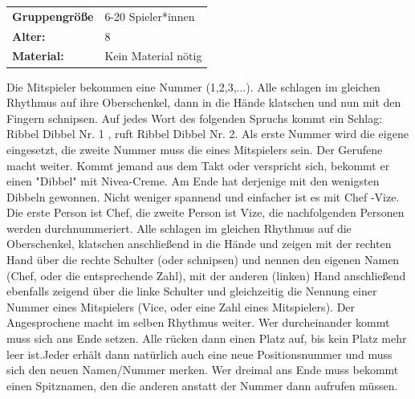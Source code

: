 \begin{table}[H]
\begin{tabular}{>{\bfseries}lp{8cm}}
   Gruppengröße   & 6-20 Spieler*innen\\
    Alter: & 8 \\
    Material: & Kein Material nötig \\
\end{tabular}
\end{table}
 Die Mitspieler bekommen eine Nummer (1,2,3,...). Alle schlagen im gleichen Rhythmus auf ihre Oberschenkel, dann in die Hände klatschen und nun mit den Fingern schnipsen. Auf jedes Wort des folgenden Spruchs kommt ein Schlag: Ribbel Dibbel Nr. 1 , ruft Ribbel Dibbel Nr. 2. Als erste Nummer wird die eigene eingesetzt, die zweite Nummer muss die eines Mitspielers sein. Der Gerufene macht weiter. Kommt jemand aus dem Takt oder verspricht sich, bekommt er einen "Dibbel" mit Nivea-Creme. Am Ende hat derjenige mit den wenigsten Dibbeln gewonnen.
Nicht weniger spannend und einfacher ist es mit Chef -Vize. Die erste Person ist Chef, die zweite Person ist Vize, die nachfolgenden Personen werden durchnummeriert. Alle schlagen im gleichen Rhythmus auf die Oberschenkel, klatschen anschließend in die Hände und zeigen mit der rechten Hand über die rechte Schulter 
(oder schnipsen) und nennen den eigenen Namen (Chef, oder die entsprechende Zahl), mit der anderen (linken) Hand anschließend ebenfalls zeigend über die linke Schulter und gleichzeitig die Nennung einer Nummer eines Mitspielers (Vice, oder eine Zahl eines Mitspielers). Der Angesprochene macht im selben Rhythmus weiter. Wer durcheinander kommt muss sich ans Ende setzen. Alle rücken dann einen Platz auf, bis kein Platz mehr leer ist.Jeder erhält dann natürlich auch eine neue Positionsnummer und muss sich den neuen Namen/Nummer merken. Wer dreimal ans Ende muss bekommt einen Spitznamen, den die anderen anstatt der Nummer dann aufrufen müssen.
\\


